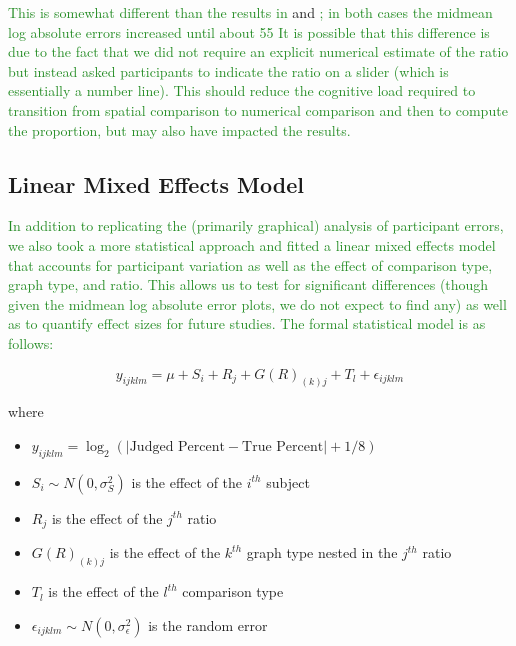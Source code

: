 \documentclass[letterpaper,inpress,dvipsnames]{jdsart}
\begin{document}
{\textcolor{ForestGreen}{This is somewhat different than the results in}} \citet{cleveland_graphical_1984} and \citet{heerCrowdsourcingGraphicalPerception2010b}{\textcolor{ForestGreen}{; in both cases the midmean log absolute errors increased until about 55%
It is possible that this difference is due to the fact that we did not require an explicit numerical estimate of the ratio but instead asked participants to indicate the ratio on a slider (which is essentially a number line). 
This should reduce the cognitive load required to transition from spatial comparison to numerical comparison and then to compute the proportion, but may also have impacted the results.}}

\hypertarget{linear-mixed-effects-model}{%
\subsection{Linear Mixed Effects Model}\label{linear-mixed-effects-model}}

{\textcolor{ForestGreen}{In addition to replicating the (primarily graphical) analysis of participant errors, we also took a more statistical approach and fitted a linear mixed effects model that accounts for participant variation as well as the effect of comparison type, graph type, and ratio. This allows us to test for significant differences (though given the midmean log absolute error plots, we do not expect to find any) as well as to quantify effect sizes for future studies. The formal statistical model is as follows:}}

\[y_{ijklm}=\mu+S_i+R_j+G(R)_{(k)j}+T_l+\epsilon_{ijklm}\]

\noindent where

\begin{itemize}
\item
  \(y_{ijklm}=\log_2(|\text{Judged Percent} - \text{True Percent}|+1/8)\)
\item
  \(S_i\sim N(0,\sigma^2_S)\) is the effect of the \(i^{th}\) subject
\item
  \(R_j\) is the effect of the \(j^{th}\) ratio
\item
  \(G(R)_{(k)j}\) is the effect of the \(k^{th}\) graph type nested in the \(j^{th}\) ratio
\item
  \(T_l\) is the effect of the \(l^{th}\) comparison type
\item
  \(\epsilon_{ijklm}\sim N(0,\sigma^2_\epsilon)\) is the random error
\end{itemize}
\end{document}
